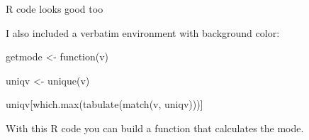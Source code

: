 
\begin{frame}[fragile]{R code looks good too}

I also included a verbatim environment with background color:

\begin{cverbatim}
getmode <- function(v) {
  
  uniqv <- unique(v)
  
  uniqv[which.max(tabulate(match(v, uniqv)))]
  
}
\end{cverbatim}

With this R code you can build a function that calculates the mode.

\end{frame}

















